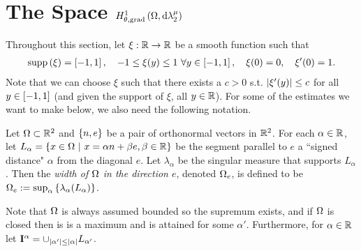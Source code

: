 \section{The Space $H^1_{\theta, \mathrm{grad}}\left( \Omega, \mathrm{d}\lambda_2^{\mu} \right)$} \label{sec:CompSobSpaces}

Throughout this section, let $\xi:\mathbb{R}\rightarrow\mathbb{R}$ be a smooth function such that
\begin{align*}
	\mathrm{supp}\left( \xi \right) = \left[ -1,1 \right], \quad -1\leq\xi(y)\leq1 \ \forall y\in\left[ -1,1 \right], \quad \xi(0)=0, \quad \xi'(0)=1.
\end{align*}
Note that we can choose $\xi$ such that there exists a $c>0$ s.t. $\left\lvert \xi'(y) \right\rvert\leq c$ for all $y\in\left[ -1,1 \right]$ (and given the support of $\xi$, all $y\in\mathbb{R}$).
For some of the estimates we want to make below, we also need the following notation.
\begin{definition}
	Let $\Omega\subset\mathbb{R}^2$ and $\left\{ n, e \right\}$ be a pair of orthonormal vectors in $\mathbb{R}^2$.
	For each $\alpha\in\mathbb{R}$, let $L_{\alpha} = \left\{ x\in\Omega \ \middle\vert \  x = \alpha n + \beta e, \beta\in\mathbb{R} \right\}$ be the segment parallel to $e$ a ``signed distance" $\alpha$ from the diagonal $e$.
	Let $\lambda_{\alpha}$ be the singular measure that supports $L_{\alpha}$.
	Then the \emph{width of $\Omega$ in the direction $e$}, denoted $\Omega_e$, is defined to be $\Omega_e := \sup_{\alpha}\left\{ \lambda_{\alpha}(L_{\alpha}) \right\}$.
\end{definition}
Note that $\Omega$ is always assumed bounded so the supremum exists, and if $\Omega$ is closed then is is a maximum and is attained for some $\alpha'$.
Furthermore, for $\alpha\in\mathbb{R}$ let $\mathbf{I}^{\alpha} = \cup_{\left\lvert \alpha' \right\rvert\leq\left\lvert \alpha \right\rvert}L_{\alpha'}$.

